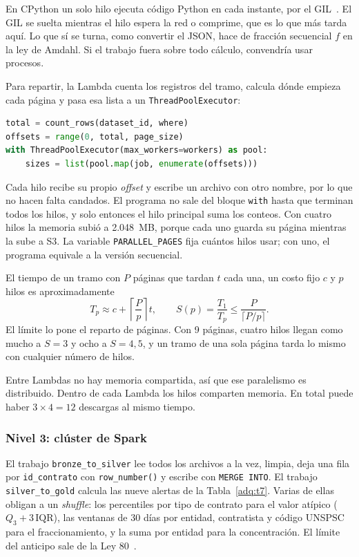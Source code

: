 En CPython un solo hilo ejecuta código Python en cada instante, por el GIL~\cite{psf_threading,psf_futures}. El GIL se suelta mientras el hilo espera la red o comprime, que es lo que más tarda aquí. Lo que sí se turna, como convertir el JSON, hace de fracción secuencial $f$ en la ley de Amdahl. Si el trabajo fuera sobre todo cálculo, convendría usar procesos.

Para repartir, la Lambda cuenta los registros del tramo, calcula dónde empieza cada página y pasa esa lista a un \texttt{ThreadPoolExecutor}:

\begin{lstlisting}[language=Python]
total = count_rows(dataset_id, where)
offsets = range(0, total, page_size)
with ThreadPoolExecutor(max_workers=workers) as pool:
    sizes = list(pool.map(job, enumerate(offsets)))
\end{lstlisting}

Cada hilo recibe su propio \textit{offset} y escribe un archivo con otro nombre, por lo que no hacen falta candados. El programa no sale del bloque \texttt{with} hasta que terminan todos los hilos, y solo entonces el hilo principal suma los conteos. Con cuatro hilos la memoria subió a 2.048~MB, porque cada uno guarda su página mientras la sube a S3. La variable \texttt{PARALLEL\_\allowbreak PAGES} fija cuántos hilos usar; con uno, el programa equivale a la versión secuencial.

El tiempo de un tramo con $P$ páginas que tardan $t$ cada una, un costo fijo $c$ y $p$ hilos es aproximadamente
\begin{equation}
T_p \approx c + \left\lceil \frac{P}{p} \right\rceil t, \qquad S(p) = \frac{T_1}{T_p} \leq \frac{P}{\lceil P/p \rceil}.
\end{equation}
El límite lo pone el reparto de páginas. Con 9 páginas, cuatro hilos llegan como mucho a $S = 3$ y ocho a $S = 4{,}5$, y un tramo de una sola página tarda lo mismo con cualquier número de hilos.

Entre Lambdas no hay memoria compartida, así que ese paralelismo es distribuido. Dentro de cada Lambda los hilos comparten memoria. En total puede haber $3 \times 4 = 12$ descargas al mismo tiempo.

\subsubsection{Nivel 3: clúster de Spark}
El trabajo \texttt{bronze\_to\_silver} lee todos los archivos a la vez, limpia, deja una fila por \texttt{id\_contrato} con \texttt{row\_number()} y escribe con \texttt{MERGE INTO}. El trabajo \texttt{silver\_to\_gold} calcula las nueve alertas de la Tabla~\ref{adq:t7}. Varias de ellas obligan a un \textit{shuffle}: los percentiles por tipo de contrato para el valor atípico ($Q_3 + 3\,\mathrm{IQR}$), las ventanas de 30 días por entidad, contratista y código UNSPSC para el fraccionamiento, y la suma por entidad para la concentración. El límite del anticipo sale de la Ley 80~\cite{ley80}.


